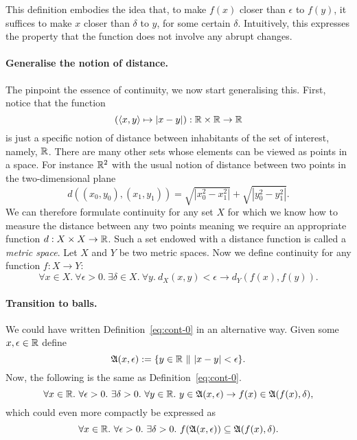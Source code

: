 This definition embodies the idea that, to make $f(x)$ closer than $\epsilon$ to $f(y)$, it
suffices to make $x$ closer than $\delta$ to $y$, for some certain $\delta$. Intuitively, this
expresses the property that the function does not involve any abrupt changes.

\paragraph*{Generalise the notion of distance.}
The pinpoint the essence of continuity, we now start generalising this. First, notice that
the function
\begin{equation*}
  (\langle x, y \rangle \mapsto | x - y |) : \mathbb{R}{} \times \mathbb{R}{} \rightarrow \mathbb{R}{}
\end{equation*}
is just a specific notion of distance between inhabitants of the set of interest, namely,
$\mathbb{R}{}$. There are many other sets whose elements can be viewed as points in a space.
For instance $\mathbb{R}{}^2$ with the usual notion of distance between two points in the
two-dimensional plane
\begin{equation*}
  d((x_0, y_0) , (x_1 , y_1)) = \sqrt{| x_0^2 - x_1^2 |} + \sqrt{| y_0^2 - y_1^2 |}.
\end{equation*}
We can therefore formulate continuity for any set $X$ for which we know how to measure the
distance between any two points meaning we require an appropriate function $d : X \times
X \rightarrow \mathbb{R}{}$. Such a set endowed with a distance function is called a
\emph{metric space}. Let $X$ and $Y$ be two metric spaces. Now we define continuity for
any function $f : X \rightarrow Y$:
\begin{equation*}
  \forall x \in X.~ \forall \epsilon > 0.~ \exists \delta \in X.~ \forall y.~ d_X(x, y) < \epsilon \rightarrow d_Y(f(x), f(y)).
\end{equation*}

\paragraph*{Transition to balls.}
We could have written Definition~\ref{eq:cont-0} in an alternative way. Given some
$x, \epsilon \in \mathbb{R}{}$ define
\begin{equation*}
  \mathfrak{A}(x, \epsilon) := \{ y \in \mathbb{R}{}~\|~| x - y | < \epsilon \}.
\end{equation*}
Now, the following is the same as Definition~\ref{eq:cont-0}.
\begin{equation*}
  \forall x \in \mathbb{R}{}.~ \forall \epsilon > 0.~ \exists \delta > 0.~ \forall y \in \mathbb{R}{}.~
    y \in \mathfrak{A}(x, \epsilon) \rightarrow f(x) \in \mathfrak{A}(f(x), \delta),
\end{equation*}
which could even more compactly be expressed as
\begin{equation*}\label{eq:cont-5}
  \forall x \in \mathbb{R}{}.~ \forall \epsilon > 0.~ \exists \delta > 0.~ f(\mathfrak{A}(x, \epsilon)) \subseteq \mathfrak{A}(f(x), \delta).
\end{equation*}

